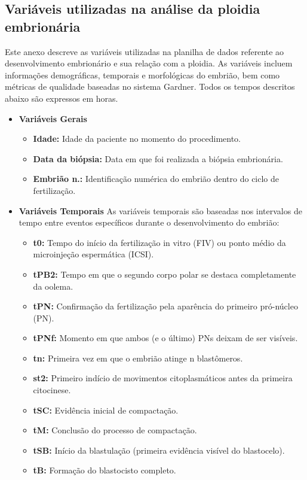 \begin{apendicesenv}

\partapendices

\chapter{Variáveis utilizadas na análise da ploidia embrionária}

Este anexo descreve as variáveis utilizadas na planilha de dados referente ao desenvolvimento embrionário e sua relação com a ploidia. As variáveis incluem informações demográficas, temporais e morfológicas do embrião, bem como métricas de qualidade baseadas no sistema Gardner. Todos os tempos descritos abaixo são expressos em horas.

\begin{itemize}
  \item \textbf{Variáveis Gerais}
  \begin{itemize}
      \item \textbf{Idade:} Idade da paciente no momento do procedimento.
      \item \textbf{Data da biópsia:} Data em que foi realizada a biópsia embrionária.
      \item \textbf{Embrião n.:} Identificação numérica do embrião dentro do ciclo de fertilização.
  \end{itemize}
\end{itemize}

\begin{itemize}
  \item \textbf{Variáveis Temporais}
  As variáveis temporais são baseadas nos intervalos de tempo entre eventos específicos durante o desenvolvimento do embrião:
  \begin{itemize}
    \item \textbf{t0:} Tempo do início da fertilização in vitro (FIV) ou ponto médio da microinjeção espermática (ICSI).
    \item \textbf{tPB2:} Tempo em que o segundo corpo polar se destaca completamente da oolema.
    \item \textbf{tPN:} Confirmação da fertilização pela aparência do primeiro pró-núcleo (PN).
    \item \textbf{tPNf:} Momento em que ambos (e o último) PNs deixam de ser visíveis.
    \item \textbf{tn:} Primeira vez em que o embrião atinge n blastômeros.
    \item \textbf{st2:} Primeiro indício de movimentos citoplasmáticos antes da primeira citocinese.
    \item \textbf{tSC:} Evidência inicial de compactação.
    \item \textbf{tM:} Conclusão do processo de compactação.
    \item \textbf{tSB:} Início da blastulação (primeira evidência visível do blastocelo).
    \item \textbf{tB:} Formação do blastocisto completo.
  \end{itemize}
\end{itemize}


\end{apendicesenv}
